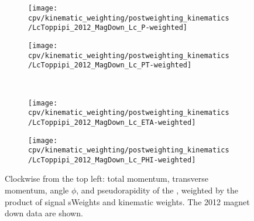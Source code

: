 \begin{figure}
  \begin{subfigure}[b]{0.4\textwidth}
    \texttt{[image: cpv/kinematic\_weighting/postweighting\_kinematics/LcToppipi\_2012\_MagDown\_Lc\_P-weighted]}
    \label{fig:cpv:kinematic_weighting:post:Lc:P}
  \end{subfigure}
  \begin{subfigure}[b]{0.4\textwidth}
    \texttt{[image: cpv/kinematic\_weighting/postweighting\_kinematics/LcToppipi\_2012\_MagDown\_Lc\_PT-weighted]}
    \label{fig:cpv:kinematic_weighting:post:Lc:PT}
  \end{subfigure}\\
  \begin{subfigure}[b]{0.4\textwidth}
    \texttt{[image: cpv/kinematic\_weighting/postweighting\_kinematics/LcToppipi\_2012\_MagDown\_Lc\_ETA-weighted]}
    \label{fig:cpv:kinematic_weighting:post:Lc:ETA}
  \end{subfigure}
  \begin{subfigure}[b]{0.4\textwidth}
    \texttt{[image: cpv/kinematic\_weighting/postweighting\_kinematics/LcToppipi\_2012\_MagDown\_Lc\_PHI-weighted]}
    \label{fig:cpv:kinematic_weighting:post:Lc:PHI}
  \end{subfigure}
  \caption{%
    Clockwise from the top left: total momentum, transverse momentum, angle
    $\phi$, and pseudorapidity of the \PLambdac, weighted by the product of
    signal sWeights and kinematic weights.
    The 2012 magnet down data are shown.
  }
  \label{fig:cpv:kinematic_weighting:post:Lc}
\end{figure}

